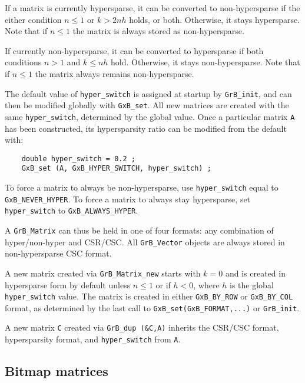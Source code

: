 \documentclass[12pt]{article}
\begin{document}
If a matrix is currently hypersparse, it can be converted to non-hypersparse if
the either condition $n \le 1$ or $k > 2nh$ holds, or both.  Otherwise, it
stays hypersparse.  Note that if $n \le 1$ the matrix is always stored as
non-hypersparse.

If currently non-hypersparse, it can be converted to hypersparse if
both conditions $n > 1$ and $k \le nh$ hold.  Otherwise, it stays
non-hypersparse.  Note that if $n \le 1$ the matrix always remains
non-hypersparse.

The default value of \verb'hyper_switch' is assigned at startup by
\verb'GrB_init', and can then be modified globally with \verb'GxB_set'.  All
new matrices are created with the same \verb'hyper_switch', determined by the
global value.  Once a particular matrix \verb'A' has been constructed, its
hypersparsity ratio can be modified from the default with:

    {\footnotesize
    \begin{verbatim}
    double hyper_switch = 0.2 ;
    GxB_set (A, GxB_HYPER_SWITCH, hyper_switch) ; \end{verbatim}}

To force a matrix to always be non-hypersparse, use \verb'hyper_switch' equal to
\verb'GxB_NEVER_HYPER'.  To force a matrix to always stay hypersparse, set
\verb'hyper_switch' to \verb'GxB_ALWAYS_HYPER'.

A \verb'GrB_Matrix' can thus be held in one of four formats: any combination of
hyper/non-hyper and CSR/CSC.  All \verb'GrB_Vector' objects are always stored
in non-hypersparse CSC format.

A new matrix created via \verb'GrB_Matrix_new' starts with $k=0$ and is created
in hypersparse form by default unless $n \le 1$ or if $h<0$, where $h$ is the
global \verb'hyper_switch' value.  The matrix is created in either
\verb'GxB_BY_ROW' or \verb'GxB_BY_COL' format, as determined by the last call
to \verb'GxB_set(GxB_FORMAT,...)' or \verb'GrB_init'.

A new matrix \verb'C' created via \verb'GrB_dup (&C,A)' inherits the CSR/CSC
format, hypersparsity format, and \verb'hyper_switch' from \verb'A'.

\subsection{Bitmap matrices}
\label{bitmap_switch}
\end{document}
